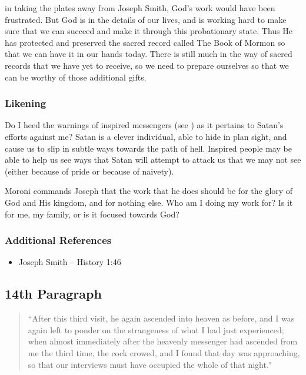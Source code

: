 \documentclass[12pt]{report}
\begin{document}
in taking the plates away from Joseph Smith, God's work would have been frustrated.  But God is in the details of our lives, and is working hard to make sure that we can succeed and make it through this probationary state.  Thus He has protected and preserved the sacred record called The Book of Mormon so that we can have it in our hands today.  There is still much in the way of sacred records that we have yet to receive, so we need to prepare ourselves so that we can be worthy of those additional gifts.

\subsubsection{Likening\label{js:likening13}}
Do I heed the warnings of inspired messengers (see ) as it pertains to Satan's efforts against me?  Satan is a clever individual, able to hide in plan sight, and cause us to slip in subtle ways towards the path of hell.  Inspired people may be able to help us see ways that Satan will attempt to attack us that we may not see (either because of pride or because of naivety).

Moroni commands Joseph that the work that he does should be for the glory of God and His kingdom, and for nothing else.  Who am I doing my work for?  Is it for me, my family, or is it focused towards God?

\subsubsection{Additional References\label{js:referencces13}}
\begin{itemize}
\item Joseph Smith -- History 1:46
\end{itemize}

\subsection{14th Paragraph\label{js:14th}}
\begin{center}
\begin{quote}
``After this third visit, he again ascended into heaven as before, and I was again left to ponder on the strangeness of what I had just experienced; when almost immediately after the heavenly messenger had ascended from me the third time, the cock crowed, and I found that day was approaching, so that our interviews must have occupied the whole of that night."
\end{quote}
\end{center}
\end{document}
